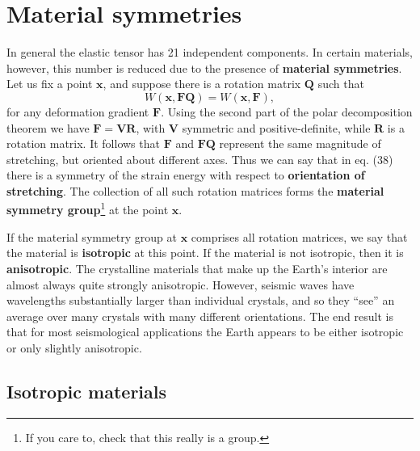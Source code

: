 \documentclass [a4paper,12pt]{paper}
\begin{document}
\section*{Material symmetries}

In general the elastic tensor has 21 independent components. In certain materials, however, this number is reduced due to 
the presence of \textbf{material symmetries}. Let us fix a point $\mathbf{x}$, and suppose there is a rotation matrix $\mathbf{Q}$ such that
\begin{equation}
W(\mathbf{x}, \mathbf{F}\mathbf{Q}) = W(\mathbf{x}, \mathbf{F}),
\end{equation}
for any deformation gradient $\mathbf{F}$. Using the second part of the polar decomposition theorem we
 have $\mathbf{F} = \mathbf{V}\mathbf{R}$, with $\mathbf{V}$ symmetric and positive-definite, while $\mathbf{R}$ is a
  rotation matrix. It follows that $\mathbf{F}$ and $\mathbf{F}\mathbf{Q}$ represent the same magnitude of stretching,
   but oriented about different axes. Thus we can say that in eq. (38) there is a symmetry of the strain energy with 
   respect to \textbf{orientation of stretching}. The collection of all such rotation matrices forms the \textbf{material symmetry 
   group}\footnote{If you care to, check that this really is a group.} at the point $\mathbf{x}$.

If the material symmetry
group at $\mathbf{x}$ comprises all rotation matrices, we say that the material is \textbf{isotropic} at this point. If the material 
   is not isotropic, then it is \textbf{anisotropic}. The crystalline materials that make up the Earth's interior are almost always 
   quite strongly anisotropic. However, seismic waves have wavelengths substantially larger than individual crystals, and so they ``see'' an 
   average over many crystals with many different orientations. The end result is that for most seismological applications the Earth 
   appears to be either isotropic or only slightly anisotropic.

\subsection*{Isotropic materials}
\end{document}
